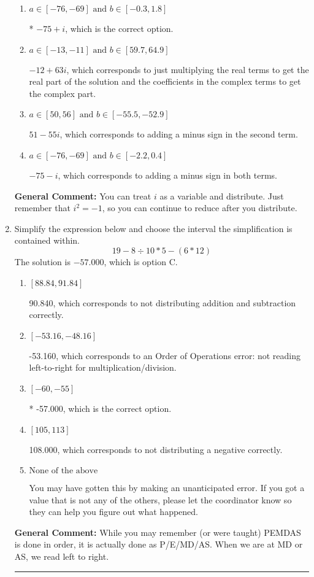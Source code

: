 \documentclass{extbook}[14pt]
\newcommand{\litem}[1]{\item #1

\rule{\textwidth}{0.4pt}}
\begin{document}
\begin{enumerate}
{\begin{enumerate}[label=\Alph*.]
 $51 + 55 i$, which corresponds to adding a minus sign in the first term.
\item \( a \in [-76, -69] \text{ and } b \in [-0.3, 1.8] \)

* $-75 + i$, which is the correct option.
\item \( a \in [-13, -11] \text{ and } b \in [59.7, 64.9] \)

 $-12 + 63 i$, which corresponds to just multiplying the real terms to get the real part of the solution and the coefficients in the complex terms to get the complex part.
\item \( a \in [50, 56] \text{ and } b \in [-55.5, -52.9] \)

 $51 - 55 i$, which corresponds to adding a minus sign in the second term.
\item \( a \in [-76, -69] \text{ and } b \in [-2.2, 0.4] \)

 $-75 - i$, which corresponds to adding a minus sign in both terms.
\end{enumerate}

\textbf{General Comment:} You can treat $i$ as a variable and distribute. Just remember that $i^2=-1$, so you can continue to reduce after you distribute.
}
\litem{
Simplify the expression below and choose the interval the simplification is contained within.
\[ 19 - 8 \div 10 * 5 - (6 * 12) \]The solution is \( -57.000 \), which is option C.\begin{enumerate}[label=\Alph*.]
\item \( [88.84, 91.84] \)

 90.840, which corresponds to not distributing addition and subtraction correctly.
\item \( [-53.16, -48.16] \)

 -53.160, which corresponds to an Order of Operations error: not reading left-to-right for multiplication/division.
\item \( [-60, -55] \)

* -57.000, which is the correct option.
\item \( [105, 113] \)

 108.000, which corresponds to not distributing a negative correctly.
\item \( \text{None of the above} \)

 You may have gotten this by making an unanticipated error. If you got a value that is not any of the others, please let the coordinator know so they can help you figure out what happened.
\end{enumerate}

\textbf{General Comment:} While you may remember (or were taught) PEMDAS is done in order, it is actually done as P/E/MD/AS. When we are at MD or AS, we read left to right.
}
\end{enumerate}
\end{document}
